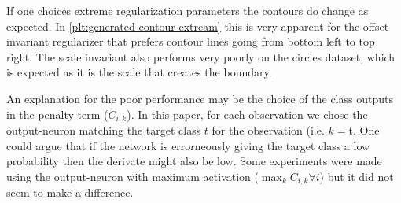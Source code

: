 If one choices extreme regularization parameters the contours do change as expected. In \cref{plt:generated-contour-extream} this is very apparent for the offset invariant regularizer that prefers contour lines going from bottom left to top right. The scale invariant also performs very poorly on the circles dataset, which is expected as it is the scale that creates the boundary.

An explanation for the poor performance may be the choice of the class outputs in the penalty term ($C_{i,k}$). In this paper, for each observation we chose the output-neuron matching the target class $t$ for the observation (i.e. $k=$t. One could argue that if the network is errorneously giving the target class a low probability then the derivate might also be low. Some experiments were made using the output-neuron with maximum activation ($\max_k C_{i,k} \forall i$) but it did not seem to make a difference.
